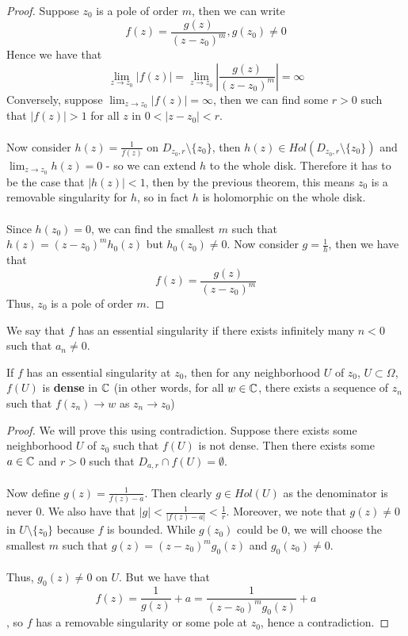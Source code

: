 \begin{proof}
Suppose $z_0$ is a pole of order $m$, then we can write
\[f(z) = \frac{g(z)}{(z - z_0)^m}, g(z_0) \neq 0\]
Hence we have that
\[\lim_{z \to z_0} |f(z)| = \lim_{z \to z_0} |\frac{g(z)}{(z - z_0)^m}| = \infty\]
Conversely, suppose $\lim_{z \to z_0} |f(z)| = \infty$, then we can find some $r > 0$ such that $|f(z)| > 1$ for all $z$ in $0 < |z - z_0| < r$.\\\\
Now consider $h(z) = \frac{1}{f(z)}$ on $D_{z_0, r} \setminus \{z_0\}$, then $h(z) \in Hol(D_{z_0, r} \setminus \{z_0\})$ and $\lim_{z \to z_0} h(z) = 0$ - so we can extend $h$ to the whole disk. Therefore it has to be the case that $|h(z)| < 1$, then by the previous theorem, this means $z_0$ is a removable singularity for $h$, so in fact $h$ is holomorphic on the whole disk.\\\\
Since $h(z_0) = 0$, we can find the smallest $m$ such that $h(z) = (z - z_0)^m h_0(z)$ but $h_0(z_0) \neq 0$. Now consider $g = \frac{1}{h}$, then we have that
\[f(z) = \frac{g(z)}{(z - z_0)^m}\]
Thus, $z_0$ is a pole of order $m$.
\end{proof}

We say that $f$ has an essential singularity if there exists infinitely many $n < 0$ such that $a_n \neq 0$.

\begin{theorem}
If $f$ has an essential singularity at $z_0$, then for any neighborhood $U$ of $z_0$, $U \subset \Omega$, $f(U)$ is \textbf{dense} in $\mathbb{C}$ (in other words, for all $w \in \mathbb{C}$, there exists a sequence of $z_n$ such that $f(z_n) \to w$ as $z_n \to z_0$)
\end{theorem}

\begin{proof}
We will prove this using contradiction. Suppose there exists some neighborhood $U$ of $z_0$ such that $f(U)$ is not dense. Then there exists some $a \in \mathbb{C}$ and $r > 0$ such that $D_{a, r} \cap f(U) = \emptyset$.\\\\
Now define $g(z) = \frac{1}{f(z) - a}$. Then clearly $g \in Hol(U)$ as the denominator is never $0$. We also have that $|g| < \frac{1}{|f(z) - a|} < \frac{1}{r}$. Moreover, we note that $g(z) \neq 0$ in $U \setminus \{z_0\}$ because $f$ is bounded. While $g(z_0)$ could be $0$, we will choose the smallest $m$ such that $g(z) = (z - z_0)^m g_0(z)$ and $g_0(z_0) \neq 0$.\\\\
Thus, $g_0(z) \neq 0$ on $U$. But we have that
\[f(z) = \frac{1}{g(z)} + a = \frac{1}{(z - z_0)^m g_0(z)} + a\]
, so $f$ has a removable singularity or some pole at $z_0$, hence a contradiction.
\end{proof}

